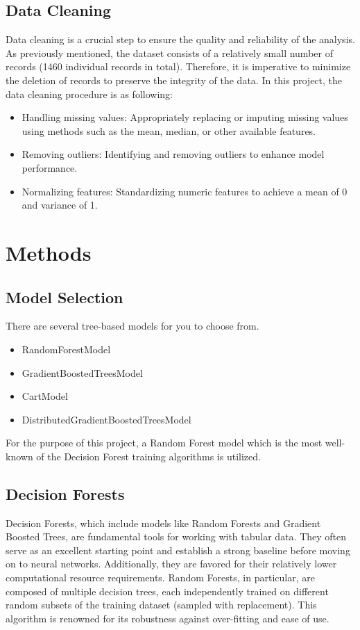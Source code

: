 \documentclass{article}
\begin{document}
\subsection{Data Cleaning}
Data cleaning is a crucial step to ensure the quality and reliability of the analysis. As previously mentioned, the dataset consists of a relatively small number of records (1460 individual records in total). Therefore, it is imperative to minimize the deletion of records to preserve the integrity of the data. In this project, the data cleaning procedure is as following:
\begin{itemize}
    \item Handling missing values: Appropriately replacing or imputing missing values using methods such as the mean, median, or other available features.
    \item Removing outliers: Identifying and removing outliers to enhance model performance.
    \item Normalizing features: Standardizing numeric features to achieve a mean of 0 and variance of 1.
\end{itemize}


\section{Methods}
\subsection{Model Selection}
There are several tree-based models for you to choose from.

\begin{itemize}
    \item RandomForestModel
    \item GradientBoostedTreesModel
    \item CartModel
    \item DistributedGradientBoostedTreesModel
\end{itemize}

For the purpose of this project, a Random Forest model which is the most well-known of the Decision Forest training algorithms is utilized. 

\subsection{Decision Forests}
Decision Forests, which include models like Random Forests and Gradient Boosted Trees, are fundamental tools for working with tabular data. They often serve as an excellent starting point and establish a strong baseline before moving on to neural networks. Additionally, they are favored for their relatively lower computational resource requirements. Random Forests, in particular, are composed of multiple decision trees, each independently trained on different random subsets of the training dataset (sampled with replacement). This algorithm is renowned for its robustness against over-fitting and ease of use.
\end{document}
